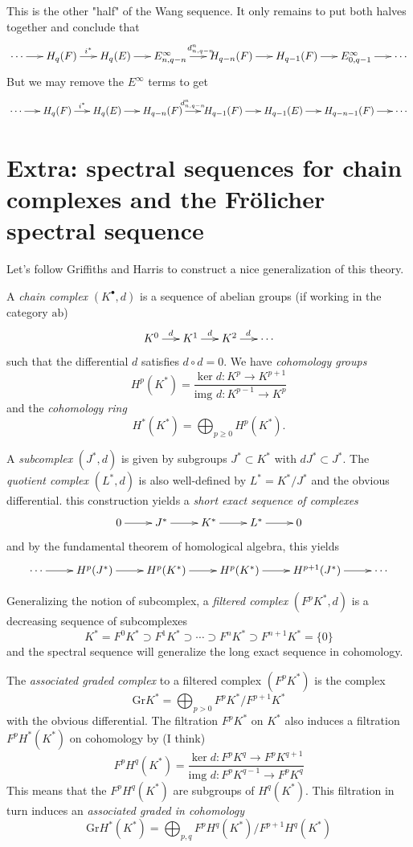 This is the other "half" of the Wang
sequence. It only remains to put both halves
together and conclude that
$$
\xymatrix@C=1.5em{
	\cdots\ar[r]&H_{q}(F)\ar[r]^{i^*}&H_{q}(E)
	\ar[r]
	&E^{\infty}_{n,q-n}\ar[r]^{d^n_{n,q-n}}
	&H_{q-n}(F)\ar[r]&H_{q-1}(F)\ar[r]
	&E^{\infty}_{0,q-1}\ar[r]&\cdots
}
$$
But we may remove the $E^{\infty}$ terms to get
$$
\xymatrix@C=1.5em{
	\cdots\ar[r]&H_{q}(F)\ar[r]^{i^*}&H_{q}(E)
	\ar[r]
	&H_{q-n}(F)\ar[r]^{d^n_{n,q-n}}&H_{q-1}(F)
	\ar[r]
	&H_{q-1}(E)\ar[r]&H_{q-n-1}(F)\ar[r]&\cdots
}
$$

\section{Extra: spectral sequences for chain
complexes and the Fr\"olicher spectral
sequence}
\label{section-extra-spect-seque-chain}
Let's follow Griffiths and Harris to
construct a nice generalization of this
theory.

A {\it chain complex} $(K^\bullet,d)$ is a
sequence of abelian groups (if working in the
category $\text{ab}$)
$$
\xymatrix@C=1.5em{
	K^{0}\ar[r]^{d}&K^{1}\ar[r]^{d}&K^2\ar[r]
	^{d}&\cdots
}
$$
such that the differential $d$ satisfies
$d\circ d=0$. We have {\it cohomology groups}
$$H^{p}(K^*)=\frac{\ker d:K^p\to
K^{p+1}}{\text{img }d:K^{p-1}\to K^p}$$
and the {\it cohomology ring}
$$H^{*}(K^*)=\bigoplus_{p\geq 0}
H^{p}(K^*).$$

A {\it subcomplex} $(J^*,d)$ is given by
subgroups $J^*\subset K^*$
 with $dJ^*\subset J^*$.
The {\it quotient complex} $(L^*,d)$ is also
well-defined by $L^*=K^*/J^*$ and the obvious
differential. this construction yields a {\it
short exact sequence of complexes}
$$
\xymatrix{
	0\ar[r]&J^*\ar[r]&K^*\ar[r]&L^*\ar[r]&0
}
$$
and by the fundamental theorem of homological
algebra, this yields
$$
\xymatrix{
	\cdots\ar[r]&H^{p}(J^*)\ar[r]&H^{p}(K^*)
	\ar[r]
	&H^{p}(K^*)\ar[r]&H^{p+1}(J^*)\ar[r]&\cdots
}
$$

Generalizing the notion of subcomplex, a {\it
filtered complex} $(F^pK^*,d)$ is a
decreasing sequence of subcomplexes
$$K^*=F^0K^*\supset
F^1K^*\supset\cdots\supset F^nK^*\supset
F^{n+1}K^*=\{0\}$$
and the spectral sequence will generalize the
long exact sequence in cohomology.

The {\it associated graded complex} to a
filtered complex $ (F^pK^*)$ is the complex
$$\text{Gr}K^*=\bigoplus_{p>0}
F^pK^*/F^{p+1}K^* $$
with the obvious differential. The filtration
$F^pK^*$ on $K^*$ also induces a filtration
$F^pH^*(K^*)$ on cohomology by (I think)
$$F^pH^q(K^*)=\frac{\ker d:F^pK^q\to
F^pK^{q+1}}{\text{img }d:F^pK^{q-1}\to
F^pK^q}$$
This means that the $F^pH^q(K^*)$ are
subgroups of $H^{q}(K^*)$. This filtration in
turn induces an {\it associated graded in
cohomology}
$$\text{Gr}H^*(K^*)=\bigoplus_{p,q}
F^pH^q(K^*)\big/F^{p+1}H^q(K^*)
$$


